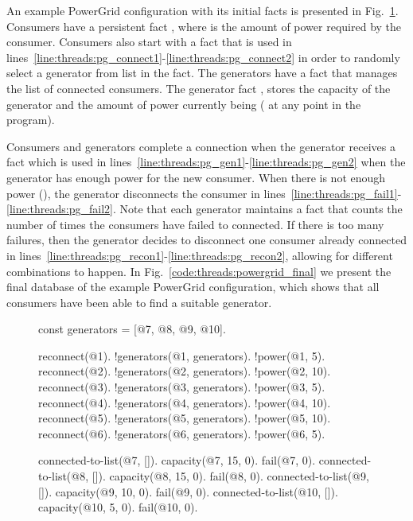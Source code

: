 An example PowerGrid configuration with its initial facts is presented in
Fig.~\ref{code:threads:powergrid_init}. Consumers have a persistent fact
, where  is the amount of power required by the
consumer. Consumers also start with a
 fact that is used in
lines~\ref{line:threads:pg_connect1}-\ref{line:threads:pg_connect2} in order to
randomly select a generator from list  in the 
fact. The generators have a  fact that manages the
list of connected consumers. The generator fact ,
stores the  capacity of the generator and the amount of power
currently being  ( at any point in the program).

Consumers and generators complete a connection when the generator receives a
 fact which is used in
lines~\ref{line:threads:pg_gen1}-\ref{line:threads:pg_gen2} when the generator
has enough power for the new consumer. When there is not enough power
(), the generator disconnects the consumer in
lines~\ref{line:threads:pg_fail1}-\ref{line:threads:pg_fail2}. Note that each
generator maintains a  fact that counts the number of times the
consumers have failed to connected. If there is too many failures, then the
generator decides to disconnect one consumer already connected in
lines~\ref{line:threads:pg_recon1}-\ref{line:threads:pg_recon2}, allowing for
different combinations to happen. In Fig.~\ref{code:threads:powergrid_final} we
present the final database of the example PowerGrid configuration, which shows
that all consumers have been able to find a suitable generator.

\begin{figure}[h!]
\begin{LineCode}[commandchars=*\#\&]
const generators = [@7, @8, @9, @10].

reconnect(@1).   !generators(@1, generators).   !power(@1, 5).
reconnect(@2).   !generators(@2, generators).   !power(@2, 10).
reconnect(@3).   !generators(@3, generators).   !power(@3, 5).
reconnect(@4).   !generators(@4, generators).   !power(@4, 10).
reconnect(@5).   !generators(@5, generators).   !power(@5, 10).
reconnect(@6).   !generators(@6, generators).   !power(@6, 5).

connected-to-list(@7, []).    capacity(@7, 15, 0).   fail(@7, 0).
connected-to-list(@8, []).    capacity(@8, 15, 0).   fail(@8, 0).
connected-to-list(@9, []).    capacity(@9, 10, 0).   fail(@9, 0).
connected-to-list(@10, []).   capacity(@10, 5, 0).   fail(@10, 0).
\end{LineCode}
\label{code:threads:powergrid_init}
\end{figure}

